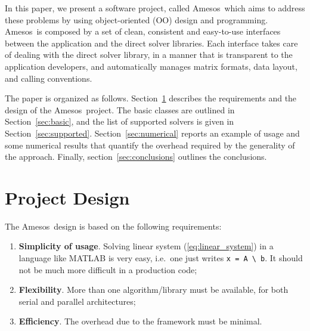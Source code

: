 \documentclass{llncs}
\newcommand{\amesos}{{\sc Amesos}}
\begin{document}
In this paper, we present a software project, called \amesos\, which aims to
address these problems by using object-oriented (OO) design and programming.
\amesos\ is composed by a set of clean, consistent and easy-to-use interfaces
between the application and the direct solver libraries.  Each interface takes
care of dealing with the direct solver library, in a manner that is
transparent to the application developers, and automatically manages matrix
formats, data layout, and calling conventions. \smallskip

\smallskip

The paper is organized as follows. Section~\ref{sec:design} describes the
requirements and the design of the \amesos\ project. The basic classes are
outlined in Section~\ref{sec:basic}, and the list of supported solvers is
given in Section~\ref{sec:supported}.  Section~\ref{sec:numerical} reports an
example of usage and some numerical results that quantify the overhead
required by the generality of the approach.  Finally,
section~\ref{sec:conclusions} outlines the conclusions.

\section{Project Design}
\label{sec:design}

The \amesos\ design is based on the following requirements:
\begin{enumerate}
%
\item {\bf Simplicity of usage}. Solving linear system (\ref{eq:linear_system}) in a language
like MATLAB is very easy, i.e.~one just writes \verb!x = A \ b!. It should not be much
more difficult in a production code;
%
\item {\bf Flexibility}. More than one algorithm/library must be available,
  for both serial and parallel architectures;
%
\item {\bf Efficiency}. The overhead due to the framework must be minimal.
\end{enumerate}
\end{document}
